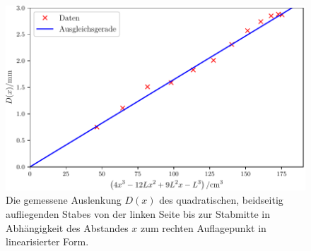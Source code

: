 \begin{figure}
	\centering
	\includegraphics[scale=.8]{content/images/StabQuadratBeidseitig3.pdf}
	\caption{Die gemessene Auslenkung $D(x)$ des quadratischen, beidseitig aufliegenden Stabes von der linken Seite bis zur Stabmitte in Abhängigkeit des Abstandes $x$ zum rechten Auflagepunkt in linearisierter Form.}
	\label{fig:beidseitiglinear2}
\end{figure}

